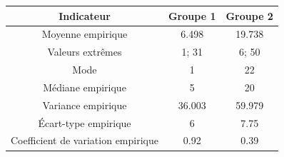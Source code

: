 \documentclass[a4paper,11pt]{article}
\theoremstyle{nonumberplain}
\theoremstyle{nonumberplain}
\theoremstyle{nonumberplain}
\theoremstyle{nonumberplain}
\begin{document}
        \medskip
        \begin{center}
            \begin{tabular}{|c|c|c|}
                \hline
                \textbf{Indicateur} & \textbf{Groupe 1} & \textbf{Groupe 2} \\
                \hline
                Moyenne empirique & \hspace{8ex}6.498\hspace{8ex} & \hspace{8ex}19.738\hspace{8ex} \\
                \hline
                Valeurs extrêmes & \hspace{8ex}1; 31\hspace{8ex} & \hspace{8ex}6; 50\hspace{8ex} \\
                \hline
                Mode & \hspace{8ex}1\hspace{8ex} & \hspace{8ex}22\hspace{8ex} \\
                \hline
                Médiane empirique & \hspace{8ex}5\hspace{8ex} & \hspace{8ex}20\hspace{8ex} \\
                \hline
                \hline
                Variance empirique & \hspace{8ex}36.003\hspace{8ex} & \hspace{8ex}59.979\hspace{8ex} \\
                \hline
                \'{E}cart-type empirique & \hspace{8ex}6\hspace{8ex} & \hspace{8ex}7.75\hspace{8ex} \\
                \hline
                Coefficient de variation empirique & \hspace{8ex}0.92\hspace{8ex} & \hspace{8ex}0.39\hspace{8ex} \\
                \hline
            \end{tabular}


\end{center}
\end{document}
